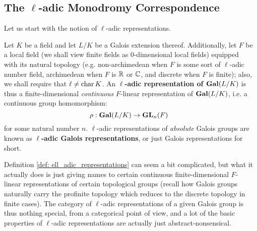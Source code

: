         \subsection{The \texorpdfstring{$\ell$}{}-adic Monodromy Correspondence}
            Let us start with the notion of $\ell$-adic representations. 
            \begin{definition} \label{def: ell_adic_representations}
                Let $K$ be a field and let $L/K$ be a Galois extension thereof. Additionally, let $F$ be a local field (we shall view finite fields as $0$-dimensional local fields) equipped with its natural topology (e.g. non-archimedean when $F$ is some sort of $\ell$-adic number field, archimedean when $F$ is $\mathbb{R}$ or $\mathbb{C}$, and discrete when $F$ is finite); also, we shall require that $\ell \not = \operatorname{char} K$. An \textbf{$\ell$-adic representation of $\mathbf{Gal}(L/K)$} is thus a finite-dimensional \textit{continuous} $F$-linear representation of $\mathbf{Gal}(L/K)$, i.e. a continuous group homomorphism:
                    $$\rho: \mathbf{Gal}(L/K) \to \mathbf{GL}_n(F)$$
                for some natural number $n$. $\ell$-adic representations of \textit{absolute} Galois groups are known as \textbf{$\ell$-adic Galois representations}, or just Galois representations for short.
            \end{definition}
            \begin{remark}
                Definition \ref{def: ell_adic_representations} can seem a bit complicated, but what it actually does is just giving names to certain continuous finite-dimensional $F$-linear representations of certain topological groups (recall how Galois groups naturally carry the profinite topology which reduces to the discrete topology in finite cases). The category of $\ell$-adic representations of a given Galois group is thus nothing special, from a categorical point of view, and a lot of the basic properties of $\ell$-adic representations are actually just abstract-nonsensical. 
            \end{remark}
